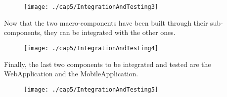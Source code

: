 \begin{figure}[H]
\centerline{\texttt{[image: ./cap5/IntegrationAndTesting3]}}
\end{figure}
Now that the two macro-components have been built through their sub-components, they can be integrated with the other ones. \\
\begin{figure}[H]
\centerline{\texttt{[image: ./cap5/IntegrationAndTesting4]}}
\end{figure}
Finally, the last two components to be integrated and tested are the WebApplication and the MobileApplication. 
\begin{figure}[H]
\centerline{\texttt{[image: ./cap5/IntegrationAndTesting5]}}
\end{figure}



